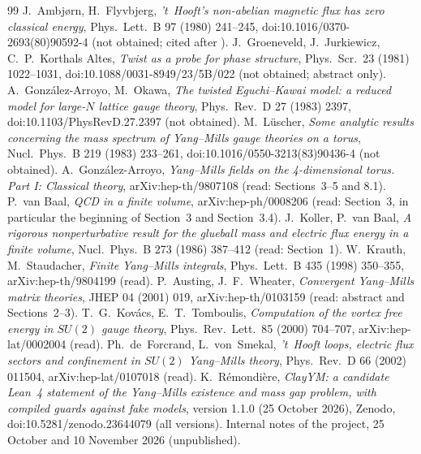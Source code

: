 \documentclass[11pt,a4paper]{article}
\theoremstyle{plain}
\theoremstyle{definition}
\theoremstyle{remark}
\numberwithin{equation}{section}
\begin{document}
{\begin{thebibliography}{99}
 J.~Ambj{\o}rn, H.~Flyvbjerg, \emph{'t~Hooft's non-abelian magnetic flux has zero classical energy}, Phys.\ Lett.\ B 97 (1980) 241--245, doi:10.1016/0370-2693(80)90592-4 (not obtained; cited after \cite{vB82}).
 J.~Groeneveld, J.~Jurkiewicz, C.~P.~Korthals Altes, \emph{Twist as a probe for phase structure}, Phys.\ Scr.\ 23 (1981) 1022--1031, doi:10.1088/0031-8949/23/5B/022 (not obtained; abstract only).
 A.~Gonz\'alez-Arroyo, M.~Okawa, \emph{The twisted Eguchi--Kawai model: a reduced model for large-$N$ lattice gauge theory}, Phys.\ Rev.\ D 27 (1983) 2397, doi:10.1103/PhysRevD.27.2397 (not obtained).
 M.~L\"uscher, \emph{Some analytic results concerning the mass spectrum of Yang--Mills gauge theories on a torus}, Nucl.\ Phys.\ B 219 (1983) 233--261, doi:10.1016/0550-3213(83)90436-4 (not obtained).
 A.~Gonz\'alez-Arroyo, \emph{Yang--Mills fields on the 4-dimensional torus. Part I: Classical theory}, arXiv:hep-th/9807108 (read: Sections~3--5 and 8.1).
 P.~van Baal, \emph{QCD in a finite volume}, arXiv:hep-ph/0008206 (read: Section~3, in particular the beginning of Section~3 and Section~3.4).
 J.~Koller, P.~van Baal, \emph{A rigorous nonperturbative result for the glueball mass and electric flux energy in a finite volume}, Nucl.\ Phys.\ B 273 (1986) 387--412 (read: Section~1).
 W.~Krauth, M.~Staudacher, \emph{Finite Yang--Mills integrals}, Phys.\ Lett.\ B 435 (1998) 350--355, arXiv:hep-th/9804199 (read).
 P.~Austing, J.~F.~Wheater, \emph{Convergent Yang--Mills matrix theories}, JHEP 04 (2001) 019, arXiv:hep-th/0103159 (read: abstract and Sections~2--3).
 T.~G.~Kov\'acs, E.~T.~Tomboulis, \emph{Computation of the vortex free energy in $SU(2)$ gauge theory}, Phys.\ Rev.\ Lett.\ 85 (2000) 704--707, arXiv:hep-lat/0002004 (read).
 Ph.~de~Forcrand, L.~von~Smekal, \emph{'t~Hooft loops, electric flux sectors and confinement in $SU(2)$ Yang--Mills theory}, Phys.\ Rev.\ D 66 (2002) 011504, arXiv:hep-lat/0107018 (read).
 K.~R\'emondi\`ere, \emph{ClayYM: a candidate Lean~4 statement of the Yang--Mills existence and mass gap problem, with
compiled guards against fake models}, version 1.1.0 (25 October 2026), Zenodo, doi:10.5281/zenodo.23644079 (all versions).
 Internal notes of the project, 25 October and 10 November 2026 (unpublished).
\end{thebibliography}}
\end{document}
